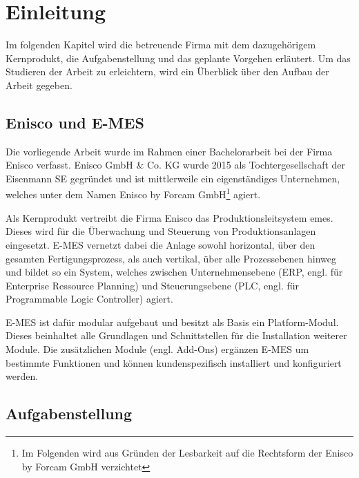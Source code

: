 \chapter{Einleitung\label{chap1:Erstes-Kapitel}}

Im folgenden Kapitel wird die betreuende Firma mit dem dazugehörigem Kernprodukt, die Aufgabenstellung und das geplante Vorgehen erläutert. Um das Studieren der Arbeit zu erleichtern, wird ein Überblick über den Aufbau der Arbeit gegeben.

\section{Enisco und E-MES\label{sec1.1:unterpunkt-1}}

Die vorliegende Arbeit wurde im Rahmen einer Bachelorarbeit bei der Firma Enisco verfasst. Enisco GmbH \& Co. KG wurde 2015 als Tochtergesellschaft der Eisenmann SE gegründet und ist mittlerweile ein eigenständiges Unternehmen, welches unter dem Namen \glqq Enisco by Forcam GmbH\footnote{Im Folgenden wird aus Gründen der Lesbarkeit auf die Rechtsform der Enisco by Forcam GmbH verzichtet}\grqq{} agiert.

Als Kernprodukt vertreibt die Firma Enisco das Produktionsleitsystem \glqq \gls{emes}\grqq{}. Dieses wird für die Überwachung und Steuerung von Produktionsanlagen eingesetzt. E-MES vernetzt dabei die Anlage sowohl horizontal, über den gesamten Fertigungsprozess, als auch vertikal, über alle Prozessebenen hinweg und bildet so ein System, welches zwischen Unternehmensebene (ERP, engl. für Enterprise Ressource Planning) und Steuerungsebene (PLC, engl. für Programmable Logic
Controller) agiert. \cite{EniscobyForcamGmbH.2021b}

E-MES ist dafür modular aufgebaut und besitzt als Basis ein Platform-Modul. Dieses beinhaltet alle Grundlagen und Schnittstellen für die Installation weiterer Module. Die zusätzlichen Module (engl. Add-Ons) ergänzen E-MES um bestimmte Funktionen und können kundenspezifisch installiert und konfiguriert werden.

\section{Aufgabenstellung\label{sec1.2:Unterpunkt-2}}

